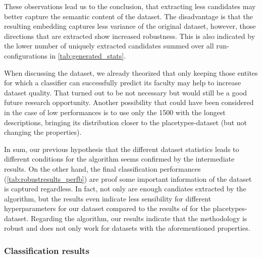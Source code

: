 These observations lead us to the conclusion, that extracting less candidates may better capture the semantic content of the dataset. The disadvantage is that the resulting embedding captures less variance of the original dataset, however, those directions that are extracted show increased robustness. This is also indicated by the lower number of uniquely extracted candidates summed over all run-configurations in \autoref{tab:generated_stats}. 

When discussing the dataset, we already theorized that only keeping those entites for which a classifier can successfully predict its faculty may help to increase dataset quality. That turned out to be not necessary but would still be a good future research opportunity. Another possibility that could have been considered in the case of low performances is to use only the 1500 with the longest descriptions, bringing its distribution closer to the placetypes-dataset (but not changing the properties). 


In sum, our previous hypothesis that the different dataset statistics leads to different conditions for the algorithm seems confirmed by the intermediate results. On the other hand, the final classification performances (\autoref{tab:robustresults_perfb}) are proof some important information of the dataset is captured regardless. In fact, not only are enough candiates extracted by the algorithm, but the results even indicate less sensibility for different hyperparameters for our dataset compared to the results of \cite{Derrac2015} for the placetypes-dataset. Regarding the algorithm, our results indicate that the methodology is robust and does not only work for datasets with the aforementioned properties.


\subsubsection{Classification results}



